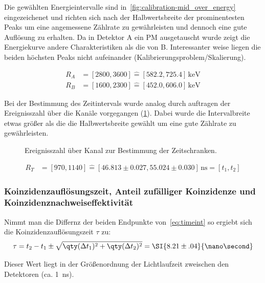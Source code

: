 \documentclass[slug=PET, room=Andreas-Schubert-Bau\,\ 424A, supervisor=Carsten\ Bittrich, coursedate=10.\ 01.\ 2020]{../../Lab_Report_LaTeX/lab_report}
\begin{document}
Die gew\"ahlten Energieintervalle sind
in~\ref{fig:calibration-mid_over_energy} eingezeichenet und richten
sich nach der Halbwertsbreite der prominentesten Peaks um eine
angemessene Z\"ahlrate zu gew\"ahrleisten und dennoch eine gute
Auflösung zu erhalten. Da in Detektor A ein PM ausgetauscht wurde
zeigt die Energiekurve andere Charakteristiken als die von
B. Interessanter weise liegen die beiden h\"ochsten Peaks nicht
aufeinander (Kalibrierungsproblem/Skalierung).

\begin{align}
  R_A &= [2800, 3600] \hat{=} [582.2, 725.4]\,\si{\kilo\electronvolt}
  \\
  R_B &= [1600, 2300] \hat{=} [452.0, 606.0]\,\si{\kilo\electronvolt}
\end{align}

Bei der Bestimmung des Zeitintervals wurde analog durch auftragen der
Ereignisszahl \"uber die Kan\"ale vorgegangen
(\ref{fig:calibration-time_range}). Dabei wurde die Intervalbreite
etwas gr\"o\ss{}er als die die Halbwertsbreite gew\"ahlt um eine gute
Z\"ahlrate zu gew\"ahrleisten.

\begin{figure}[h]\centering
  
  \caption{Ereignisszahl \"uber Kanal zur Bestimmung der Zeitschranken.}
  \label{fig:calibration-time_range}
\end{figure}

\begin{align}
  \label{eq:timeint}
  R_T &= [970, 1140] \hat{=} [46.813\pm 0.027, 55.024\pm
        0.030]\,\si{\nano\second} = [t_1, t_2]
\end{align}

\subsubsection{Koinzidenzaufl\"osungszeit, Anteil zuf\"alliger
  Koinzidenze und Koinzidenznachweiseffektivit\"at}
\label{sec:koaufl}

Nimmt man die Differnz der beiden Endpunkte von~\eqref{eq:timeint} so
ergiebt sich die Koinzidenzaufl\"osungszeit \(\tau\) zu:
\begin{equation}
  \label{eq:koauf}
  \tau = t_2 - t_1 \pm \sqrt{\qty(\Delta t_1)^2 + \qty(\Delta t_2)^2}
  = \SI{8.21\pm .04}{\nano\second}
\end{equation}

Dieser Wert liegt in der Gr\"o\ss{}enordnung der Lichtlaufzeit
zweischen den Detektoren (ca. \SI{1}{\nano\second}).
\end{document}
